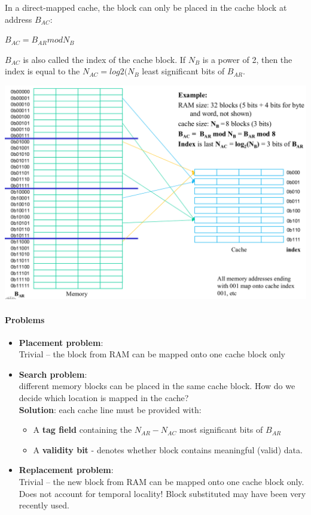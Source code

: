 In a direct-mapped cache, the block can only be placed in the cache block at address $B_{AC}$:

$B_{AC} = B_{AR} mod N_B$

$B_{AC}$ is also called the index of the cache block.
If $N_B$ is a power of 2, then the index is equal to the $N_{AC} = log2(N_{B}$ least significant bits of $B_{AR}$.

\includegraphics[width=\textwidth]{images/direct_mapped_cache.png}

\paragraph{Problems}
\begin{itemize}
    \item \textbf{Placement problem}:\\
    Trivial – the block from RAM can be mapped onto one cache block only
    \item \textbf{Search problem}:\\
    different memory blocks can be placed in the same cache block. How do we decide which location is mapped in the cache?\\
    \textbf{Solution}: each cache line must be provided with:
    \begin{itemize}
        \item A \textbf{tag field} containing the $N_{AR} - N_{AC}$ most significant bits of $B_{AR}$
        \item A \textbf{validity bit} - denotes whether block contains meaningful (valid) data.
    \end{itemize}
    \item \textbf{Replacement problem}:\\
    Trivial – the new block from RAM can be mapped onto one cache block only. Does not account for temporal locality! Block substituted may have been very recently used.
\end{itemize}

